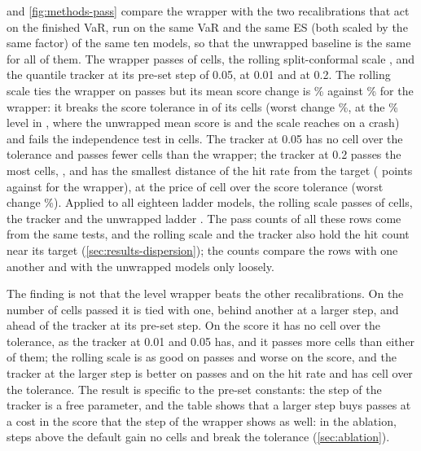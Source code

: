  and \cref{fig:methods-pass} compare the wrapper with the two recalibrations that act on the finished VaR, run on the same VaR and the same ES (both scaled by the same factor) of the same ten models, so that the unwrapped baseline is the same for all of them. The wrapper passes \tenPassAci{} of \tenRuns{} cells, the rolling split-conformal scale \cmpRollTenPass{}, and the quantile tracker \cmpTrkTenPass{} at its pre-set step of 0.05, \cmpTrkSmallTenPass{} at 0.01 and \cmpTrkLargeTenPass{} at 0.2. The rolling scale ties the wrapper on passes but its mean score change is \cmpRollTenFz\% against \tenMeanFz\% for the wrapper: it breaks the score tolerance in \cmpRollTenFzOver{} of its \cmpRollTenFzN{} cells (worst change \cmpRollTenFzWorst\%, \cmpRollWorstModel{} at the \cmpRollWorstLevel\% level in \cmpRollWorstWin, where the unwrapped mean score is \cmpRollWorstBase{} and the scale reaches \cmpRollWorstScaleMax{} on a crash) and fails the independence test in \cmpRollTenInd{} cells. The tracker at 0.05 has no cell over the tolerance and passes fewer cells than the wrapper; the tracker at 0.2 passes the most cells, \cmpTrkLargeTenPass{}, and has the smallest distance of the hit rate from the target (\cmpTrkLargeTenDev{} points against \tenHitDevAci{} for the wrapper), at the price of \cmpTrkLargeTenFzOver{} cell over the score tolerance (worst change \cmpTrkLargeTenFzWorst\%). Applied to all eighteen ladder models, the rolling scale passes \cmpRollAllPass{} of \cmpRollAllN{} cells, the tracker \cmpTrkAllPass{} and the unwrapped ladder \cmpUnwAllPass{}. The pass counts of all these rows come from the same tests, and the rolling scale and the tracker also hold the hit count near its target (\cref{sec:results-dispersion}); the counts compare the rows with one another and with the unwrapped models only loosely.

The finding is not that the level wrapper beats the other recalibrations. On the number of cells passed it is tied with one, behind another at a larger step, and ahead of the tracker at its pre-set step. On the score it has no cell over the tolerance, as the tracker at 0.01 and 0.05 has, and it passes more cells than either of them; the rolling scale is as good on passes and worse on the score, and the tracker at the larger step is better on passes and on the hit rate and has \cmpTrkLargeTenFzOver{} cell over the tolerance. The result is specific to the pre-set constants: the step of the tracker is a free parameter, and the table shows that a larger step buys passes at a cost in the score that the step of the wrapper shows as well: in the ablation, steps above the default gain no cells and break the tolerance (\cref{sec:ablation}).

